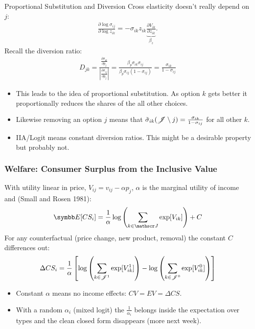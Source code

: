 \documentclass[aspectratio=169,11pt]{beamer}
\begin{document}
\begin{frame}{Proportional Substitution and Diversion}
Cross elasticity doesn't really depend on $j$:
\begin{eqnarray*}
\frac{ \partial \log \sigma_{ij}}{ \partial \log z_{ik}} = -\sigma_{ik} z_{ik} \underbrace{\frac{\partial V_{ik}}{\partial z_{ik}}}_{\beta_z}.
\end{eqnarray*}
Recall the diversion ratio:
\begin{align*}
D_{jk} =\frac{\frac{\partial \sigma_{ik}}{\partial p_{j}}}{\left |\frac{\partial \sigma_{ij}}{\partial p_{j}} \right|} = \frac{\beta_p \sigma_{ik} \sigma_{ij}}{\beta_p \sigma_{ij} (1-\sigma_{ij})} = \frac{\sigma_{ik}}{1-\sigma_{ij}}
\end{align*}
\begin{itemize}
\item This leads to the idea of \alert{proportional substitution}. As option $k$ gets better it proportionally reduces the shares of the all other choices.
\item Likewise removing an option $j$ means that $\tilde{\sigma}_{ik}(\mathscr{J} \setminus j) = \frac{\sigma_{ik}}{1-\sigma_{ij}}$ for all other $k$.
\item IIA/Logit means \alert{constant diversion ratios}. This might be a desirable property but probably not.
\end{itemize}
\end{frame}


\begin{frame}
\frametitle{Welfare: Consumer Surplus from the Inclusive Value}
With utility linear in price, $V_{ij} = v_{ij} - \alpha p_j$, $\alpha$ is the marginal utility of income and (Small and Rosen 1981):
\begin{eqnarray*}
\E[CS_i] = \frac{1}{\alpha} \log \left( \sum_{k \in \calJ} \exp[V_{ik}] \right) + C
\end{eqnarray*}
For any counterfactual (price change, new product, removal) the constant $C$ differences out:
\begin{eqnarray*}
\Delta CS_i = \frac{1}{\alpha}\left[ \log \left(\sum_{k \in \mathscr{J}^{1}} \exp[V_{ik}^{1}]\right)- \log \left( \sum_{k \in \mathscr{J}^{0}} \exp[V_{ik}^{0}] \right)\right]
\end{eqnarray*}
\begin{itemize}
\item Constant $\alpha$ means \alert{no income effects}: $CV = EV = \Delta CS$.
\item With a random $\alpha_i$ (mixed logit) the $\frac{1}{\alpha_i}$ belongs inside the expectation over types and the clean closed form disappears (more next week).
\end{itemize}
\end{frame}
\end{document}
